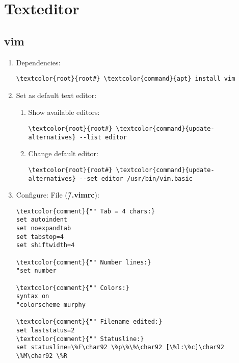 \documentclass[10pt, a4paper, onecolumn, openany]{book} %
\begin{document}
\section{Texteditor}
\subsection{vim}
\begin{enumerate}
    \item Dependencies:
\begin{Verbatim}[commandchars=\\\{\}]
\textcolor{root}{root#} \textcolor{command}{apt} install vim
\end{Verbatim}
    \item Set as default text editor:
    \begin{enumerate}
        \item Show available editors:
        \begin{Verbatim}[commandchars=\\\{\}]
\textcolor{root}{root#} \textcolor{command}{update-alternatives} --list editor
\end{Verbatim}
        \item Change default editor:
\begin{Verbatim}[commandchars=\\\{\}]
\textcolor{root}{root#} \textcolor{command}{update-alternatives} --set editor /usr/bin/vim.basic
\end{Verbatim}
    \end{enumerate}
    \item Configure:
\newline File (\textbf{\textcolor{file}{\~/.vimrc}}):
\begin{Verbatim}[commandchars=\\\{\}]
\textcolor{comment}{"" Tab = 4 chars:}
set autoindent
set noexpandtab
set tabstop=4
set shiftwidth=4

\textcolor{comment}{"" Number lines:}
"set number

\textcolor{comment}{"" Colors:}
syntax on
"colorscheme murphy

\textcolor{comment}{"" Filename edited:}
set laststatus=2
\textcolor{comment}{"" Statusline:}
set statusline=\%F\char92 \%p\%\%\char92 [\%l:\%c]\char92 \%M\char92 \%R
\end{Verbatim}
\end{enumerate}
\end{document}
